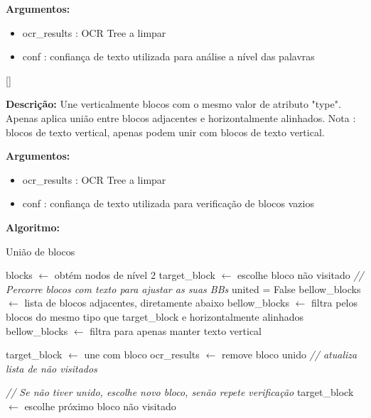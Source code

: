 \textbf{Argumentos:}
\begin{itemize}\setlength\itemsep{-0.3em}
	\item ocr\_results : OCR Tree a limpar
	\item conf : confiança de texto utilizada para análise a nível das palavras
\end{itemize}


[\normalsize]

\textbf{Descrição:} Une verticalmente blocos com o mesmo valor de atributo "type". Apenas aplica união entre blocos adjacentes e horizontalmente alinhados. Nota : blocos de texto vertical, apenas podem unir com blocos de texto vertical.

\textbf{Argumentos:}
\begin{itemize}\setlength\itemsep{-0.3em}
	\item ocr\_results : OCR Tree a limpar
	\item conf : confiança de texto utilizada para verificação de blocos vazios
\end{itemize}

\textbf{Algoritmo:}
\begin{breakablealgorithm}
	\caption{União de blocos}
	\begin{algorithmic}[1]
		
		\State blocks $\leftarrow$ obtém nodos de nível 2
		\State target\_block $\leftarrow$ escolhe bloco não visitado
		\State \textit{// Percorre blocos com texto para ajustar as suas BBs}
			\State united = False
			\State bellow\_blocks $\leftarrow$ lista de blocos adjacentes, diretamente abaixo
			\State bellow\_blocks $\leftarrow$ filtra pelos blocos do mesmo tipo que target\_block e horizontalmente alinhados
					\State bellow\_blocks $\leftarrow$ filtra para apenas manter texto vertical
				\EndIf
				
					\State target\_block $\leftarrow$ une com bloco
					\State ocr\_results $\leftarrow$ remove bloco unido
					\State \textit{// atualiza lista de não visitados}
				\EndIf
				
			\EndIf
			
			\State \textit{// Se não tiver unido, escolhe novo bloco, senão repete verificação}
				\State target\_block $\leftarrow$ escolhe próximo bloco não visitado
			\EndIf
		\EndWhile
		
		
	\end{algorithmic}
\end{breakablealgorithm}


